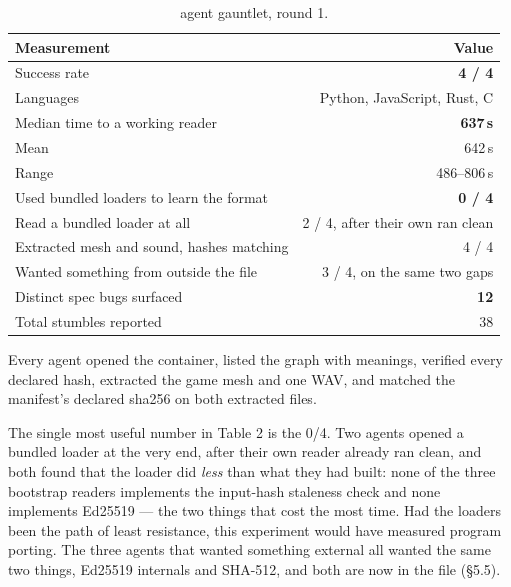 \documentclass[10pt,twocolumn,letterpaper]{article}
\begin{document}
\begin{table}[t]\centering\footnotesize
\caption{agent gauntlet, round 1.}
\begin{tabular}{@{}L{4.6cm} r@{}}
\toprule
Measurement & Value \\
\midrule
Success rate & \textbf{4 / 4} \\
Languages & Python, JavaScript, Rust, C \\
Median time to a working reader & \textbf{637\,s} \\
Mean & 642\,s \\
Range & 486--806\,s \\
Used bundled loaders to learn the format & \textbf{0 / 4} \\
Read a bundled loader at all & 2 / 4, after their own ran clean \\
Extracted mesh and sound, hashes matching & 4 / 4 \\
Wanted something from outside the file & 3 / 4, on the same two gaps \\
Distinct spec bugs surfaced & \textbf{12} \\
Total stumbles reported & 38 \\
\bottomrule
\end{tabular}
\end{table}

Every agent opened the container, listed the graph with meanings, verified every declared hash, extracted the game mesh and one WAV, and matched the manifest's declared sha256 on both extracted files.

The single most useful number in Table 2 is the 0/4. Two agents opened a bundled loader at the very end, after their own reader already ran clean, and both found that the loader did \emph{less} than what they had built: none of the three bootstrap readers implements the input-hash staleness check and none implements Ed25519 --- the two things that cost the most time. Had the loaders been the path of least resistance, this experiment would have measured program porting. The three agents that wanted something external all wanted the same two things, Ed25519 internals and SHA-512, and both are now in the file (\S5.5).
\end{document}
